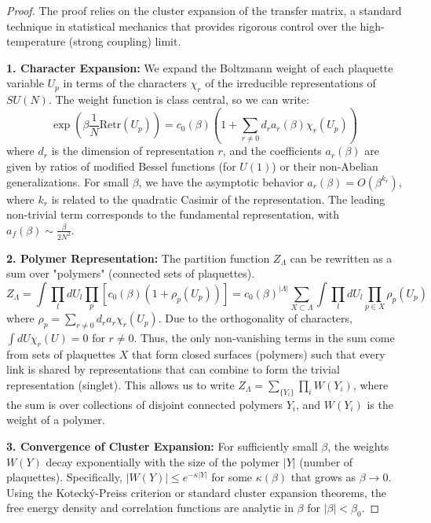 \begin{proof}
The proof relies on the cluster expansion of the transfer matrix, a standard technique in statistical mechanics that provides rigorous control over the high-temperature (strong coupling) limit.

\textbf{1. Character Expansion:}
We expand the Boltzmann weight of each plaquette variable $U_p$ in terms of the characters $\chi_r$ of the irreducible representations of $SU(N)$. The weight function is class central, so we can write:
\begin{equation}
\exp\left(\beta \frac{1}{N} \text{Re} \text{tr}(U_p)\right) = c_0(\beta) \left( 1 + \sum_{r \neq 0} d_r a_r(\beta) \chi_r(U_p) \right)
\end{equation}
where $d_r$ is the dimension of representation $r$, and the coefficients $a_r(\beta)$ are given by ratios of modified Bessel functions (for $U(1)$) or their non-Abelian generalizations. For small $\beta$, we have the asymptotic behavior $a_r(\beta) = O(\beta^{k_r})$, where $k_r$ is related to the quadratic Casimir of the representation. The leading non-trivial term corresponds to the fundamental representation, with $a_f(\beta) \sim \frac{\beta}{2N^2}$.

\textbf{2. Polymer Representation:}
The partition function $Z_\Lambda$ can be rewritten as a sum over "polymers" (connected sets of plaquettes).
\begin{equation}
Z_\Lambda = \int \prod_l dU_l \prod_p \left[ c_0(\beta) \left( 1 + \rho_p(U_p) \right) \right] = c_0(\beta)^{|\Lambda|} \sum_{X \subset \Lambda} \int \prod_l dU_l \prod_{p \in X} \rho_p(U_p)
\end{equation}
where $\rho_p = \sum_{r \neq 0} d_r a_r \chi_r(U_p)$. Due to the orthogonality of characters, $\int dU \chi_r(U) = 0$ for $r \neq 0$. Thus, the only non-vanishing terms in the sum come from sets of plaquettes $X$ that form closed surfaces (polymers) such that every link is shared by representations that can combine to form the trivial representation (singlet).
This allows us to write $Z_\Lambda = \sum_{\{Y_i\}} \prod_i W(Y_i)$, where the sum is over collections of disjoint connected polymers $Y_i$, and $W(Y_i)$ is the weight of a polymer.

\textbf{3. Convergence of Cluster Expansion:}
For sufficiently small $\beta$, the weights $W(Y)$ decay exponentially with the size of the polymer $|Y|$ (number of plaquettes). Specifically, $|W(Y)| \le e^{-\kappa |Y|}$ for some $\kappa(\beta)$ that grows as $\beta \to 0$.
Using the Kotecký-Preiss criterion or standard cluster expansion theorems, the free energy density and correlation functions are analytic in $\beta$ for $|\beta| < \beta_0$.


\end{proof}
